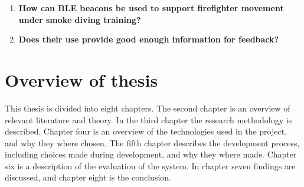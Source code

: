 \documentclass[../Main/thesis.tex]{subfiles}
\begin{document}
\begin{enumerate}
	\item \textbf{How can BLE beacons be used to support firefighter movement under smoke diving training?}
	\item \textbf{Does their use provide good enough information for feedback?}
\end{enumerate}


\section{Overview of thesis}
This thesis is divided into eight chapters.
The second chapter is an overview of relevant literature and theory.
In the third chapter the research methodology is described.
Chapter four is an overview of the technologies used in the project, and why they where chosen.
The fifth chapter describes the development process, including choices made during development, and why they where made. 
Chapter six is a description of the evaluation of the system.
In chapter seven findings are discussed, and chapter eight is the conclusion.

\onlyinsubfile{}
\onlyinsubfile{}
\end{document}
